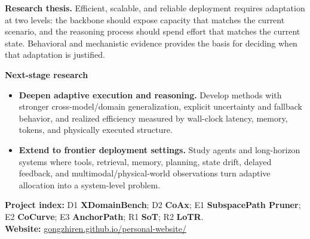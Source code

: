 \documentclass[11pt,a4paper]{article}
\newcommand{\method}[1]{{\sffamily\bfseries\color{MethodBlue}#1}}
\newcommand{\XDB}{\method{XDomainBench}}
\newcommand{\SubspacePath}{\method{SubspacePath Pruner}}
\newcommand{\CoCurve}{\method{CoCurve}}
\newcommand{\AnchorPath}{\method{AnchorPath}}
\newcommand{\CoAx}{\method{CoAx}}
\newcommand{\SoT}{\method{SoT}}
\newcommand{\LoTR}{\method{LoTR}}
\begin{document}
\begin{thesisbox}
\textbf{Research thesis.} Efficient, scalable, and reliable deployment requires adaptation at two levels: the backbone should expose capacity that matches the current scenario, and the reasoning process should spend effort that matches the current state. Behavioral and mechanistic evidence provides the basis for deciding when that adaptation is justified.
\end{thesisbox}

{\large\bfseries\color{NTUblue}Next-stage research}\\[-0.7mm]
\begin{itemize}
\item \textbf{Deepen adaptive execution and reasoning.} Develop methods with stronger cross-model/domain generalization, explicit uncertainty and fallback behavior, and realized efficiency measured by wall-clock latency, memory, tokens, and physically executed structure.
\item \textbf{Extend to frontier deployment settings.} Study agents and long-horizon systems where tools, retrieval, memory, planning, state drift, delayed feedback, and multimodal/physical-world observations turn adaptive allocation into a system-level problem.
\end{itemize}

\vfill
\footnotesize\color{DarkGray}
\textbf{Project index:} D1 \XDB; D2 \CoAx; E1 \SubspacePath; E2 \CoCurve; E3 \AnchorPath; R1 \SoT; R2 \LoTR.\\[-0.3mm]
\textbf{Website:} \href{https://gongzhiren.github.io/personal-website/}{gongzhiren.github.io/personal-website/}
\end{document}
